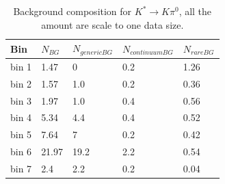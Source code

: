 \begin{table}[h]
\small
\begin{center}
\begin{tabu}to \textwidth{ |X[l]|X[c]|X[c]|X[c]|X[c]| }
\hline
 Bin & $N_{BG}$ &$N_{generic BG}$ & $N_{continuum BG}$ & $N_{rare BG}$   \\
 \hline
 bin 1  & 1.47  &0 &0.2&1.26\\ 
 \hline
 bin 2  & 1.57  &1.0 &0.2&0.36\\ 
 \hline
 bin 3  & 1.97  &1.0 &0.4&0.56\\ 
 \hline
 bin 4  & 5.34 	&4.4 &0.4&0.52 \\ 
 \hline
 bin 5  & 7.64  &7 &0.2&0.42 \\ 
 \hline
 bin 6  & 21.97 &19.2 &2.2&0.54 \\
 \hline
 bin 7  & 2.4 	&2.2 &0.2&0.04 \\ 
 \hline
 \hline
\end{tabu}
\caption{Background composition for $K^* \rightarrow K \pi^0$, all the amount are scale to one data size.} \label{t:bgcomkpi0}
\end{center}
\end{table}




